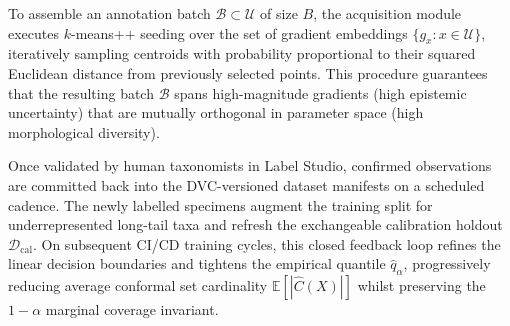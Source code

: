 To assemble an annotation batch $\mathcal{B} \subset \mathcal{U}$ of size $B$, the acquisition module executes $k$-means++ seeding over the set of gradient embeddings $\{g_x : x \in \mathcal{U}\}$, iteratively sampling centroids with probability proportional to their squared Euclidean distance from previously selected points. This procedure guarantees that the resulting batch $\mathcal{B}$ spans high-magnitude gradients (high epistemic uncertainty) that are mutually orthogonal in parameter space (high morphological diversity).

Once validated by human taxonomists in Label Studio, confirmed observations are committed back into the DVC-versioned dataset manifests on a scheduled cadence. The newly labelled specimens augment the training split for underrepresented long-tail taxa and refresh the exchangeable calibration holdout $\mathcal{D}_{\text{cal}}$. On subsequent CI/CD training cycles, this closed feedback loop refines the linear decision boundaries and tightens the empirical quantile $\hat{q}_\alpha$, progressively reducing average conformal set cardinality $\mathbb{E}[|\hat{C}(X)|]$ whilst preserving the $1 - \alpha$ marginal coverage invariant.
